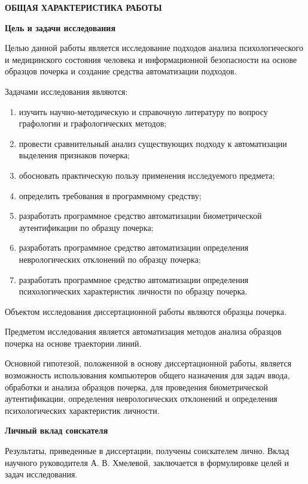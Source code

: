 \begin{center}
{\bfseries ОБЩАЯ ХАРАКТЕРИСТИКА РАБОТЫ}
\end{center}

\textbf{Цель и задачи исследования}
\bigskip

Целью данной работы является исследование подходов анализа психологического и медицинского состояния человека и информационной безопасности на основе образцов почерка и создание средства автоматизации подходов.

Задачами исследования являются:
\begin{enumerate}
  \item изучить научно-методическую и справочную литературу по вопросу графологии и графологических методов;
  \item провести сравнительный анализ существующих подходу к автоматизации выделения признаков почерка;
  \item обосновать практическую пользу применения исследуемого \mbox{предмета};
  \item определить требования в программному средству;
  \item разработать программное средство автоматизации биометрической аутентификации по образцу почерка;
  \item разработать программное средство автоматизации определения неврологических отклонений по образцу почерка;
  \item разработать программное средство автоматизации определения психологических характеристик личности по образцу почерка.
\end{enumerate}

Объектом исследования диссертационной работы являются образцы \mbox{почерка.}

Предметом исследования является автоматизация методов анализа образцов почерка на основе траектории линий.

Основной гипотезой, положенной в основу диссертационной работы, является возможность использования компьютеров общего назначения для задач ввода, обработки и анализа образцов почерка, для проведения биометрической аутентификации, определения неврологических отклонений и определения психологических характеристик личности. 

\bigskip
\textbf{Личный вклад соискателя}
\bigskip

Результаты, приведенные в диссертации, получены  соискателем лично. Вклад научного руководителя А. В. Хмелевой,  заключается в формулировке целей и задач исследования.

